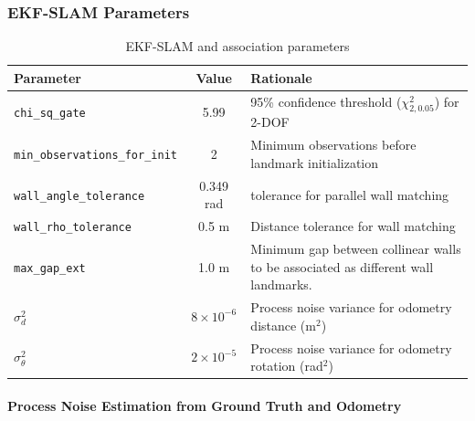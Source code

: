 \documentclass[11pt]{article}
\begin{document}
\subsubsection{EKF-SLAM Parameters}

\begin{table}[htbp]
	\centering
	\caption{EKF-SLAM and association parameters}
	\label{tab:ekf_params}
	\begin{tabular}{lcp{8cm}}
		\toprule
		\textbf{Parameter} & \textbf{Value} & \textbf{Rationale} \\
		\midrule
		\texttt{chi\_sq\_gate} & 5.99 & 95\% confidence threshold ($\chi^2_{2,0.05}$) for 2-DOF \\
		\texttt{min\_observations\_for\_init} & 2 & Minimum observations before landmark initialization \\
		\texttt{wall\_angle\_tolerance} & 0.349 rad &  tolerance for parallel wall matching \\
		\texttt{wall\_rho\_tolerance} & 0.5 m & Distance tolerance for wall matching \\
		\texttt{max\_gap\_ext} & 1.0 m & Minimum gap between collinear walls to be associated as different wall landmarks. \\
		$\sigma_d^2$ & $8\times10^{-6}$ & Process noise variance for odometry distance (m$^2$) \\
		$\sigma_\theta^2$ & $2\times10^{-5}$ & Process noise variance for odometry rotation (rad$^2$) \\
		
		\bottomrule
	\end{tabular}
\end{table}

\paragraph{Process Noise Estimation from Ground Truth and Odometry}
\end{document}
